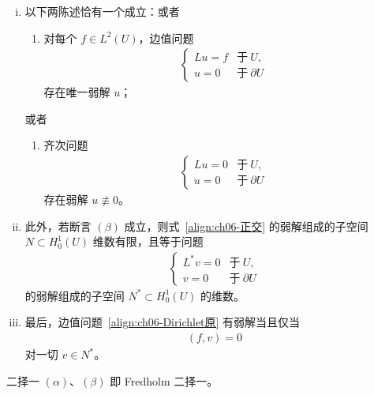 \documentclass[../../main.tex]{subfiles}
\begin{document}
\begin{theorem}[弱解的第二存在定理]\label{theorem:ch06-第二存在定理}
\begin{enumerate}[(i)]
\item 以下两陈述恰有一个成立：或者
\begin{enumerate}[$(\alpha)$]
\item 对每个 $f\in L^{2}(U)$，边值问题
\begin{align}
\begin{cases}
Lu=f & \text{于}\ U,\\
u=0 & \text{于}\ \partial U
\end{cases}
\label{align:ch06-Dirichlet原}
\end{align}
存在唯一弱解 $u$；
\end{enumerate}
或者
\begin{enumerate}[$(\beta)$]
\item 齐次问题
\begin{align}
\begin{cases}
Lu=0 & \text{于}\ U,\\
u=0 & \text{于}\ \partial U
\end{cases}
\label{align:ch06-正交}
\end{align}
存在弱解 $u\not\equiv 0$。
\end{enumerate}
\item 此外，若断言 $(\beta)$ 成立，则式~\eqref{align:ch06-正交} 的弱解组成的子空间 $N\subset H^{1}_{0}(U)$ 维数有限，且等于问题
\begin{align}
\begin{cases}
L^{*}v=0 & \text{于}\ U,\\
v=0 & \text{于}\ \partial U
\end{cases}
\label{align:ch06-伴随齐次}
\end{align}
的弱解组成的子空间 $N^{*}\subset H^{1}_{0}(U)$ 的维数。
\item 最后，边值问题~\eqref{align:ch06-Dirichlet原} 有弱解当且仅当
\begin{align*}
(f,v)=0
\end{align*}
对一切 $v\in N^{*}$。
\end{enumerate}
二择一 $(\alpha)$、$(\beta)$ 即 Fredholm 二择一。
\end{theorem}
\end{document}
